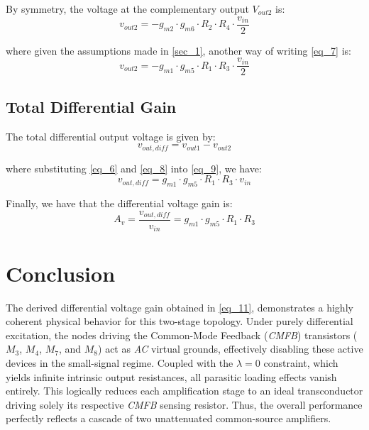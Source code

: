 \documentclass[12pt,a4paper]{article}
\begin{document}
By symmetry, the voltage at the complementary output $V_{out2}$ is:
\begin{equation}
    v_{out2} = -g_{m2} \cdot g_{m6} \cdot R_{2} \cdot R_{4} \cdot \frac{v_{in}}{2}
    \label{eq_7}
\end{equation}

where given the assumptions made in \autoref{sec_1}, another way of writing \autoref{eq_7} is:
\begin{equation}
    v_{out2} = -g_{m1} \cdot g_{m5} \cdot R_{1} \cdot R_{3} \cdot \frac{v_{in}}{2}
    \label{eq_8}
\end{equation}



\subsection{Total Differential Gain}
The total differential output voltage is given by:
\begin{equation}
    v_{out,diff} = v_{out1} - v_{out2}
    \label{eq_9}
\end{equation}

where substituting \autoref{eq_6} and \autoref{eq_8} into \autoref{eq_9}, we have:
\begin{equation}
    v_{out,diff} = g_{m1} \cdot g_{m5} \cdot R_{1} \cdot R_{3} \cdot v_{in}
    \label{eq_10}
\end{equation}

Finally, we have that the differential voltage gain is:
\begin{equation}
    A_v = \frac{v_{out,diff}}{v_{in}} = g_{m1} \cdot g_{m5} \cdot R_{1} \cdot R_{3}
    \label{eq_11}
\end{equation}



\section{Conclusion}                                            \label{sec_3}
The derived differential voltage gain obtained in \autoref{eq_11}, demonstrates a highly coherent physical behavior for this two-stage topology. Under purely differential excitation, the nodes driving the Common-Mode Feedback (\textit{CMFB}) transistors ($M_{3}$, $M_{4}$, $M_{7}$, and $M_{8}$) act as \textit{AC} virtual grounds, effectively disabling these active devices in the small-signal regime. Coupled with the $\lambda = 0$ constraint, which yields infinite intrinsic output resistances, all parasitic loading effects vanish entirely. This logically reduces each amplification stage to an ideal transconductor driving solely its respective \textit{CMFB} sensing resistor. Thus, the overall performance perfectly reflects a cascade of two unattenuated common-source amplifiers.



\printbibliography[heading=bibintoc, title={4 \, Bibliography}]
\end{document}
